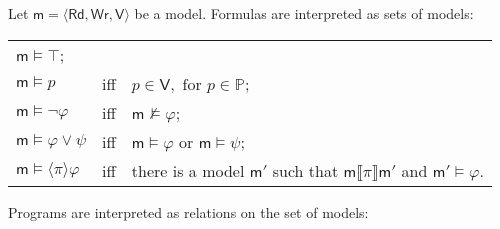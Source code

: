 \documentclass{llncs}
\newcommand{\modl}{\mathsf m}
\newcommand{\readable}[1]{\mathtt{r}_{#1}}
\newcommand{\readset}{\mathsf{Rd}}
\newcommand{\valuset}{\mathsf{V}}
\newcommand{\writable}[1]{\mathtt{w}_{#1}}
\newcommand{\writeset}{\mathsf{Wr}}
\newcommand{\intPgm}[1]{\llbracket #1 \rrbracket}
\newcommand{\ldia}[1]{ \big\langle #1 \big\rangle}
\renewcommand{\phi}{\varphi}
\newcommand{\propset}{\mathbb P}
\newcommand{\tuple}[1]{ \langle #1 \rangle}
\begin{document}
Let $\modl = \tuple{\readset,\writeset,\valuset}$ be a model. 
Formulas are interpreted as sets of models: 
\begin{center}\begin{tabular}{lll}
$\modl \models \top$;
\\
$\modl \models p $ & iff & $p \in \valuset, \text{ for } p \in \propset$;
\\
$\modl \models \lnot \phi $ & iff & $\modl \not \models \phi $;
\\
$\modl \models \phi \lor \psi$ & iff & $\modl \models \phi $ or $\modl \models \psi$;
\\
$\modl \models \ldia \pi \phi $ & iff & there is a model $\modl'$ such that $\modl \intPgm{ \pi } \modl' $ and $\modl' \models \phi$.
\end{tabular}\end{center}
Programs are interpreted as relations on the set of models: 
\end{document}
